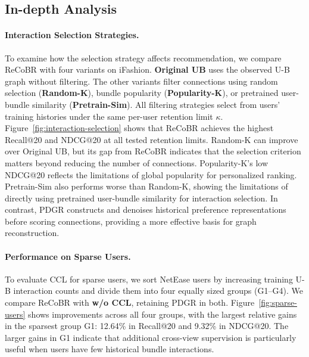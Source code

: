 \documentclass[letterpaper]{article}
\begin{document}
\subsection{In-depth Analysis}




\paragraph{Interaction Selection Strategies.}
To examine how the selection strategy affects recommendation,
we compare ReCoBR with four variants on iFashion.
\textbf{Original UB} uses the observed U-B graph without filtering.
The other variants filter connections using random selection
(\textbf{Random-K}), bundle popularity (\textbf{Popularity-K}),
or pretrained user-bundle similarity (\textbf{Pretrain-Sim}).
All filtering strategies select from users' training histories
under the same per-user retention limit $\kappa$.
Figure~\ref{fig:interaction-selection} shows that ReCoBR achieves
the highest Recall@20 and NDCG@20 at all tested retention limits.
Random-K can improve over Original UB, but its gap from ReCoBR
indicates that the selection criterion matters beyond reducing
the number of connections. Popularity-K's low NDCG@20 reflects
the limitations of global popularity for personalized ranking.
Pretrain-Sim also performs worse than Random-K, showing the
limitations of directly using pretrained user-bundle similarity
for interaction selection. In contrast, PDGR constructs and
denoises historical preference representations before scoring
connections, providing a more effective basis for graph reconstruction.













\paragraph{Performance on Sparse Users.}
To evaluate CCL for sparse users, we sort NetEase users by
increasing training U-B interaction counts and divide them
into four equally sized groups (G1--G4). We compare ReCoBR
with \textbf{w/o CCL}, retaining PDGR in both.
Figure~\ref{fig:sparse-users} shows improvements across all
four groups, with the largest relative gains in the sparsest
group G1: 12.64\% in Recall@20 and 9.32\% in NDCG@20.
The larger gains in G1 indicate that additional cross-view
supervision is particularly useful when users have few historical
bundle interactions.
\end{document}
